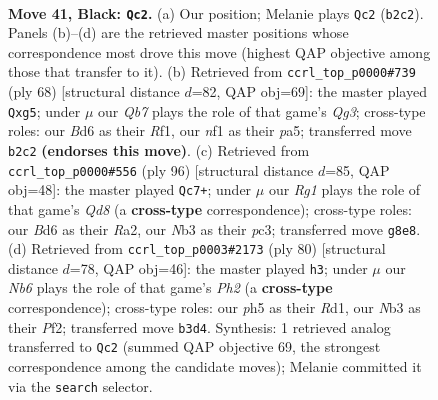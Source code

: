 \documentclass[11pt]{article}
\begin{document}
\clearpage

\begin{figure}[p]\centering
\begin{subfigure}{0.46\textwidth}\centering
\resizebox{\linewidth}{!}{%
\newchessgame
\chessboard[
  setfen={r5r1/p5pp/2kb4/3p2QP/p2P2P1/1n1RP2K/1q6/5N2 b - - 4 41},
  showmover=false,
  pgfstyle=straightmove, color=movearrow, markmove={b2-c2}
]}
\caption{}
\end{subfigure}\hfill
\begin{subfigure}{0.46\textwidth}\centering
\resizebox{\linewidth}{!}{%
\newchessgame
\chessboard[
  setfen={3rnr2/6pk/3p4/p1qppPpP/P7/2N3Q1/2P3RK/5R2 w - - 2 35},
  showmover=false,
  pgfstyle=straightmove, color=movearrow, markmove={g3-g5}
]}
\caption{}
\end{subfigure}
\\[4pt]
\begin{subfigure}{0.46\textwidth}\centering
\resizebox{\linewidth}{!}{%
\newchessgame
\chessboard[
  setfen={3Q4/5k1p/r3p1p1/PN2PpP1/5n2/2p1q2P/R6K/8 w - - 2 49},
  showmover=false,
  pgfstyle=straightmove, color=movearrow, markmove={d8-c7}
]}
\caption{}
\end{subfigure}\hfill
\begin{subfigure}{0.46\textwidth}\centering
\resizebox{\linewidth}{!}{%
\newchessgame
\chessboard[
  setfen={4r3/3n2k1/3P2pp/p2N2b1/1p2p2q/1P6/4QPBP/3R2K1 w - - 4 41},
  showmover=false,
  pgfstyle=straightmove, color=movearrow, markmove={h2-h3}
]}
\caption{}
\end{subfigure}
\caption{\textbf{Move 41, Black: \texttt{Qc2}.} (a) Our position; Melanie plays \texttt{Qc2} (\texttt{b2c2}). Panels (b)--(d) are the retrieved master positions whose correspondence most drove this move (highest QAP objective among those that transfer to it). (b) Retrieved from \texttt{ccrl\_top\_p0000\#739} (ply 68) [structural distance $d$=82, QAP obj=69]: the master played \texttt{Qxg5}; under $\mu$ our \emph{Qb7} plays the role of that game's \emph{Qg3}; cross-type roles: our \emph{B}d6 as their \emph{R}f1, our \emph{n}f1 as their \emph{p}a5; transferred move \texttt{b2c2} \textbf{(endorses this move)}. (c) Retrieved from \texttt{ccrl\_top\_p0000\#556} (ply 96) [structural distance $d$=85, QAP obj=48]: the master played \texttt{Qc7+}; under $\mu$ our \emph{Rg1} plays the role of that game's \emph{Qd8} (a \textbf{cross-type} correspondence); cross-type roles: our \emph{B}d6 as their \emph{R}a2, our \emph{N}b3 as their \emph{p}c3; transferred move \texttt{g8e8}. (d) Retrieved from \texttt{ccrl\_top\_p0003\#2173} (ply 80) [structural distance $d$=78, QAP obj=46]: the master played \texttt{h3}; under $\mu$ our \emph{Nb6} plays the role of that game's \emph{Ph2} (a \textbf{cross-type} correspondence); cross-type roles: our \emph{p}h5 as their \emph{R}d1, our \emph{N}b3 as their \emph{P}f2; transferred move \texttt{b3d4}. Synthesis: 1 retrieved analog transferred to \texttt{Qc2} (summed QAP objective 69, the strongest correspondence among the candidate moves); Melanie committed it via the \texttt{search} selector.}
\label{fig:thought-m81}
\end{figure}
\end{document}
